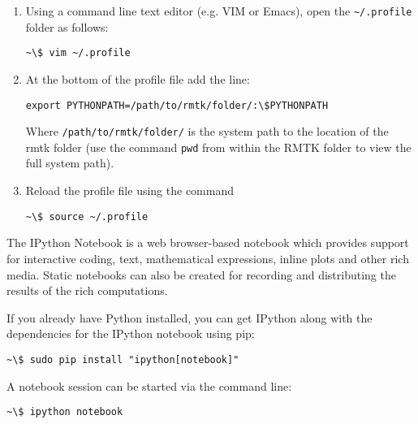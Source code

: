 \begin{enumerate}
\item Using a command line text editor (e.g. VIM or Emacs), open the \verb=~/.profile= folder as follows:

\begin{Verbatim}[frame=single, commandchars=\\\{\}, fontsize=\scriptsize]
~\$ vim ~/.profile
\end{Verbatim}

\item At the bottom of the profile file add the line:

\begin{Verbatim}[frame=single, commandchars=\\\{\}, fontsize=\scriptsize]
export PYTHONPATH=/path/to/rmtk/folder/:\$PYTHONPATH
\end{Verbatim}

Where \verb=/path/to/rmtk/folder/= is the system path to the location of the rmtk folder (use the command \verb=pwd= from within the RMTK folder to view the full system path).

\item Reload the profile file using the command

\begin{Verbatim}[frame=single, commandchars=\\\{\}, fontsize=\scriptsize]
~\$ source ~/.profile
\end{Verbatim}

\end{enumerate}

The IPython Notebook is a web browser-based notebook which provides support for interactive coding, text, mathematical expressions, inline plots and other rich media. Static notebooks can also be created for recording and distributing the results of the rich computations.

If you already have Python installed, you can get IPython along with the dependencies for the IPython notebook using pip:

\begin{Verbatim}[frame=single, commandchars=\\\{\}, fontsize=\scriptsize, samepage=true]
~\$ sudo pip install "ipython[notebook]"
\end{Verbatim}

A notebook session can be started via the command line:

\begin{Verbatim}[frame=single, commandchars=\\\{\}, fontsize=\scriptsize, samepage=true]
~\$ ipython notebook
\end{Verbatim}

